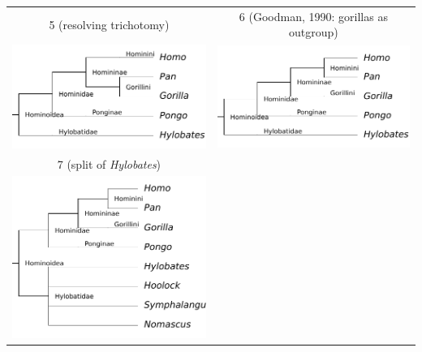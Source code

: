 \begin{samepage}
\begin{tabular}{cc}
5 (resolving trichotomy) & 6 (Goodman, 1990: gorillas as outgroup) \\
\includegraphics[scale=0.7]{homino_4.pdf} & \includegraphics[scale=0.7]{homino_5.pdf} \\
7 (split of \emph{Hylobates}) \\
\includegraphics[scale=0.7]{homino_6.pdf} & 
\end{tabular}
\end{samepage}

